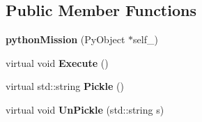 \subsection*{Public Member Functions}
\begin{DoxyCompactItemize}
\item 
{\bfseries python\+Mission} (Py\+Object $\ast$self\+\_\+)\hypertarget{classpythonMission_adb71836f80693b5e2521b424de4a2a64}{}\label{classpythonMission_adb71836f80693b5e2521b424de4a2a64}

\item 
virtual void {\bfseries Execute} ()\hypertarget{classpythonMission_accfcd3b7bc2a178b263ae1fe4448e411}{}\label{classpythonMission_accfcd3b7bc2a178b263ae1fe4448e411}

\item 
virtual std\+::string {\bfseries Pickle} ()\hypertarget{classpythonMission_a75128ad5138caccec277cd105291b152}{}\label{classpythonMission_a75128ad5138caccec277cd105291b152}

\item 
virtual void {\bfseries Un\+Pickle} (std\+::string s)\hypertarget{classpythonMission_adb7bd34b47fc3f9e6b0d77bf5621f3b6}{}\label{classpythonMission_adb7bd34b47fc3f9e6b0d77bf5621f3b6}

\end{DoxyCompactItemize}
